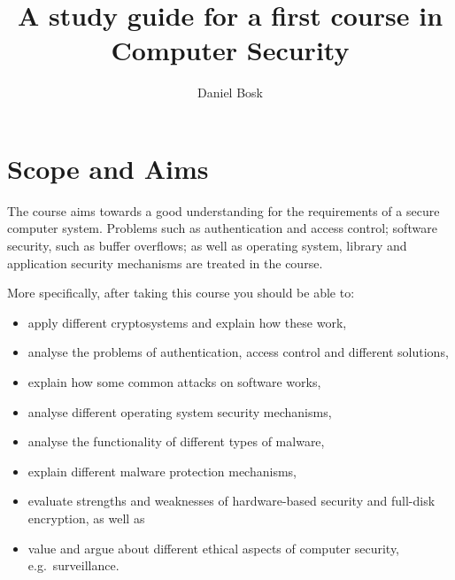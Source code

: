 \title{%
  A study guide for a first course in\\
  Computer Security
}
\author{%
  Daniel Bosk
}

\maketitle


\section{Scope and Aims}
\label{sec:aim}
The course aims towards a good understanding for the requirements of a secure 
computer system.
Problems such as authentication and access control; software security, such as 
buffer overflows; as well as operating system, library and application security 
mechanisms are treated in the course.

More specifically, after taking this course you should be able to:
\begin{itemize}
  \item apply different cryptosystems and explain how these work,
  \item analyse the problems of authentication, access control and different 
  solutions,
  \item explain how some common attacks on software works,
  \item analyse different operating system security mechanisms,
  \item analyse the functionality of different types of malware,
  \item explain different malware protection mechanisms,
  \item evaluate strengths and weaknesses of hardware-based security and 
    full-disk encryption, as well as
  \item value and argue about different ethical aspects of computer security, 
    e.g.\ surveillance.
\end{itemize}


